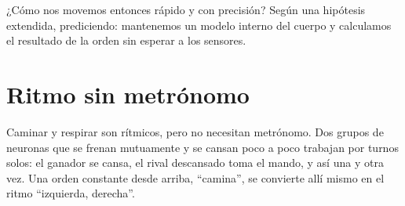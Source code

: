 ¿Cómo nos movemos entonces rápido y con precisión? Según una hipótesis extendida, prediciendo: mantenemos un modelo interno del cuerpo y calculamos el resultado de la orden sin esperar a los sensores.

\section*{Ritmo sin metrónomo}

Caminar y respirar son rítmicos, pero no necesitan metrónomo. Dos grupos de neuronas que se frenan mutuamente y se cansan poco a poco trabajan por turnos solos: el ganador se cansa, el rival descansado toma el mando, y así una y otra vez. Una orden constante desde arriba, “camina”, se convierte allí mismo en el ritmo “izquierda, derecha”.

